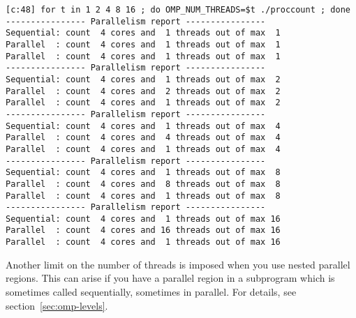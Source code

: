 \begin{multicols}{2}
  \columnbreak
\tiny
\begin{verbatim}
[c:48] for t in 1 2 4 8 16 ; do OMP_NUM_THREADS=$t ./proccount ; done
---------------- Parallelism report ----------------
Sequential: count  4 cores and  1 threads out of max  1
Parallel  : count  4 cores and  1 threads out of max  1
Parallel  : count  4 cores and  1 threads out of max  1
---------------- Parallelism report ----------------
Sequential: count  4 cores and  1 threads out of max  2
Parallel  : count  4 cores and  2 threads out of max  2
Parallel  : count  4 cores and  1 threads out of max  2
---------------- Parallelism report ----------------
Sequential: count  4 cores and  1 threads out of max  4
Parallel  : count  4 cores and  4 threads out of max  4
Parallel  : count  4 cores and  1 threads out of max  4
---------------- Parallelism report ----------------
Sequential: count  4 cores and  1 threads out of max  8
Parallel  : count  4 cores and  8 threads out of max  8
Parallel  : count  4 cores and  1 threads out of max  8
---------------- Parallelism report ----------------
Sequential: count  4 cores and  1 threads out of max 16
Parallel  : count  4 cores and 16 threads out of max 16
Parallel  : count  4 cores and  1 threads out of max 16
\end{verbatim}
\end{multicols}

Another limit on the number of threads is imposed when you use nested parallel regions.
This can arise if you have a parallel region in a subprogram which is sometimes called
sequentially, sometimes in parallel.
For details, see section~\ref{sec:omp-levels}.


